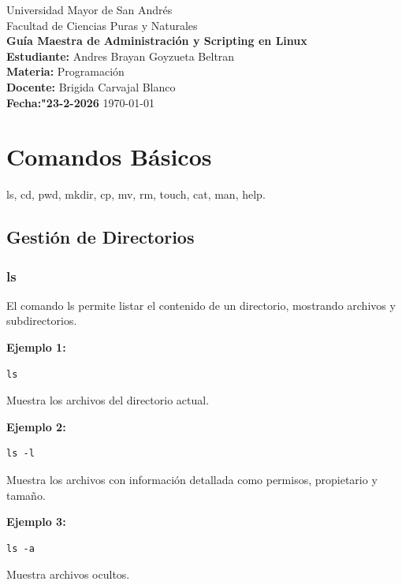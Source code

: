 \documentclass[12pt,a4paper]{article}
\begin{document}
\begin{titlepage}
\centering
{\Large Universidad Mayor de San Andrés \\}
\vspace{0.5cm}
{\large Facultad de Ciencias Puras y Naturales \\}
\vspace{1cm}
{\Huge \textbf{Guía Maestra de Administración y Scripting en Linux} \\}
\vspace{1.5cm}
\textbf{Estudiante:} Andres Brayan Goyzueta Beltran\\ 
\textbf{Materia:} Programación \\ 
\textbf{Docente:} Brigida Carvajal Blanco \\ 
\textbf{Fecha:"23-2-2026} \today
\vfill
\end{titlepage}

\tableofcontents
\newpage

\section{Comandos Básicos}
ls,
cd,
pwd,
mkdir,
cp,
mv,
rm,
touch,
cat,
man,
help.
\subsection{Gestión de Directorios}

\subsubsection{ls}
El comando ls permite listar el contenido de un directorio, mostrando archivos y subdirectorios.

\textbf{Ejemplo 1:}
\begin{lstlisting}
ls
\end{lstlisting}

Muestra los archivos del directorio actual.

\textbf{Ejemplo 2:}
\begin{lstlisting}
ls -l
\end{lstlisting}

Muestra los archivos con información detallada como permisos, propietario y tamaño.

\textbf{Ejemplo 3:}
\begin{lstlisting}
ls -a
\end{lstlisting}

Muestra archivos ocultos.
\end{document}
